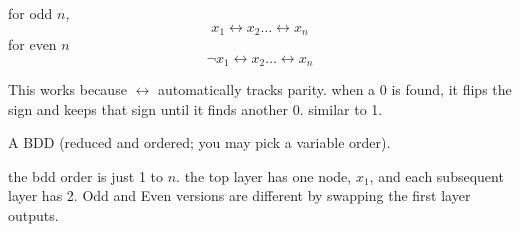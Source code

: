 \documentclass[11pt]{article}
\begin{document}
\begin{qunlist}
\begin{qparts}
    \begin{answer}
      for odd \(n\),
      \begin{equation}
        x_1\leftrightarrow x_2\dots \leftrightarrow x_n
      \end{equation}
      for even \(n\)
      \begin{equation}
        \neg x_1\leftrightarrow x_2\dots \leftrightarrow x_n
      \end{equation}

      This works because \(\leftrightarrow\) automatically tracks parity. when a 0 is found, it flips the sign and keeps that sign until it finds another 0. similar to 1.

    \end{answer}

  \item
    A BDD (reduced and ordered; you may pick a variable order).

    \begin{answer}
      the bdd order is just 1 to \(n\). the top layer has one node, \(x_1\), and each subsequent layer has 2. Odd and Even versions are different by swapping the first layer outputs.


\end{answer}
\end{qparts}
\end{qunlist}
\end{document}
